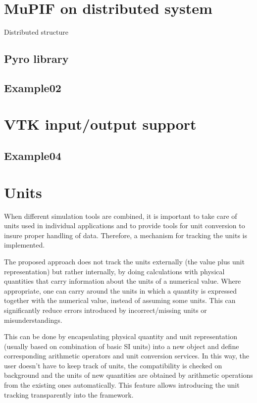\documentclass[a4paper,11pt]{article}
\begin{document}
\section{MuPIF on distributed system}
Distributed structure

\subsection{Pyro library}
\subsection{Example02}




\section{VTK input/output support}
\subsection{Example04}


\section{Units}
When different simulation tools are combined, it is important to take care of units used in individual applications and to provide tools for unit conversion to insure proper handling of data. Therefore, a mechanism for tracking the units is implemented.

The proposed approach does not track the units externally (the value plus unit representation) but rather internally, by doing calculations with physical quantities that carry information about the units of a numerical value. Where appropriate, one can carry around the units in which a quantity is expressed together with the numerical value, instead of assuming some units. This can significantly reduce errors introduced by incorrect/missing units or misunderstandings.

This can be done by encapsulating physical quantity and unit representation (usually based on combination of basic SI units) into a new object and define corresponding arithmetic operators and unit conversion services. In this way, the user doesn't have to keep track of units, the compatibility is checked on background and the units of new quantities are obtained by arithmetic operations from the existing ones automatically. This feature allows introducing the unit tracking transparently into the framework.
\end{document}
